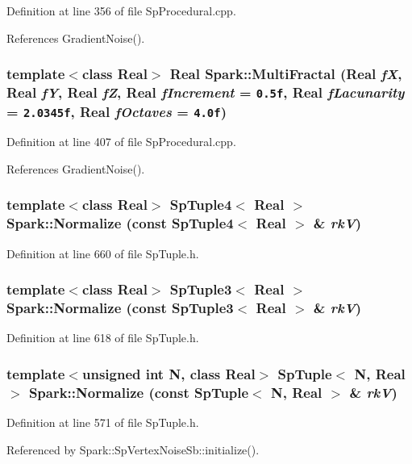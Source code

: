 Definition at line 356 of file Sp\-Procedural.cpp.

References Gradient\-Noise().
\subsubsection{\setlength{\rightskip}{0pt plus 5cm}template$<$class Real$>$ Real Spark::Multi\-Fractal (Real {\em f\-X}, Real {\em f\-Y}, Real {\em f\-Z}, Real {\em f\-Increment} = {\tt 0.5f}, Real {\em f\-Lacunarity} = {\tt 2.0345f}, Real {\em f\-Octaves} = {\tt 4.0f})}\label{namespaceSpark_a79}


Definition at line 407 of file Sp\-Procedural.cpp.

References Gradient\-Noise().
\subsubsection{\setlength{\rightskip}{0pt plus 5cm}template$<$class Real$>$ {\bf Sp\-Tuple4}$<$ Real $>$ Spark::Normalize (const Sp\-Tuple4$<$ Real $>$ \& {\em rk\-V})}\label{namespaceSpark_a128}


Definition at line 660 of file Sp\-Tuple.h.
\subsubsection{\setlength{\rightskip}{0pt plus 5cm}template$<$class Real$>$ {\bf Sp\-Tuple3}$<$ Real $>$ Spark::Normalize (const Sp\-Tuple3$<$ Real $>$ \& {\em rk\-V})}\label{namespaceSpark_a125}


Definition at line 618 of file Sp\-Tuple.h.
\subsubsection{\setlength{\rightskip}{0pt plus 5cm}template$<$unsigned int N, class Real$>$ {\bf Sp\-Tuple}$<$ N, Real $>$ Spark::Normalize (const Sp\-Tuple$<$ N, Real $>$ \& {\em rk\-V})}\label{namespaceSpark_a122}


Definition at line 571 of file Sp\-Tuple.h.

Referenced by Spark::Sp\-Vertex\-Noise\-Sb::initialize().
